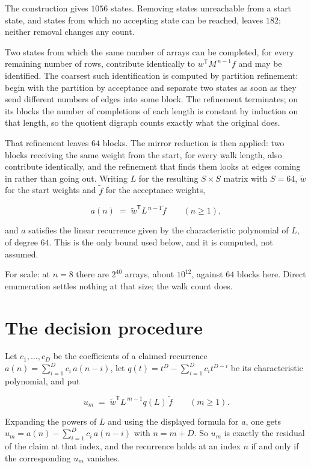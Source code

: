 \documentclass[11pt]{article}
\theoremstyle{definition}
\begin{document}
The construction gives $1056$ states. Removing states unreachable from a start state, and states from which no accepting state can be reached, leaves $182$; neither removal changes any count.

Two states from which the same number of arrays can be completed, for every remaining number of rows, contribute identically to $w^{\mathsf T}M^{\,n-1}f$ and may be identified. The coarsest such identification is computed by partition refinement: begin with the partition by acceptance and separate two states as soon as they send different numbers of edges into some block. The refinement terminates; on its blocks the number of completions of each length is constant by induction on that length, so the quotient digraph counts exactly what the original does.

That refinement leaves $64$ blocks. The mirror reduction is then applied: two blocks receiving the same weight from the start, for every walk length, also contribute identically, and the refinement that finds them looks at edges coming in rather than going out. Writing $L$ for the resulting $S \times S$ matrix with $S = 64$, $\tilde w$ for the start weights and $\tilde f$ for the acceptance weights,

\[a(n) \;=\; \tilde w^{\mathsf T} L^{\,n-1} \tilde f \qquad (n \ge 1),\]

and $a$ satisfies the linear recurrence given by the characteristic polynomial of $L$, of degree $64$. This is the only bound used below, and it is computed, not assumed.

For scale: at $n = 8$ there are $2^{40}$ arrays, about $10^{12}$, against $64$ blocks here. Direct enumeration settles nothing at that size; the walk count does.

\section{The decision procedure}

Let $c_1,\dots,c_D$ be the coefficients of a claimed recurrence $a(n) = \sum_{i=1}^{D} c_i\,a(n-i)$, let $q(t) = t^{D} - \sum_{i=1}^{D} c_i t^{D-i}$ be its characteristic polynomial, and put

\[u_m \;=\; \tilde w^{\mathsf T} L^{\,m-1} q(L)\,\tilde f \qquad (m \ge 1).\]

Expanding the powers of $L$ and using the displayed formula for $a$, one gets $u_m = a(n) - \sum_{i=1}^{D} c_i\,a(n-i)$ with $n = m + D$. So $u_m$ is exactly the residual of the claim at that index, and the recurrence holds at an index $n$ if and only if the corresponding $u_m$ vanishes.
\end{document}
